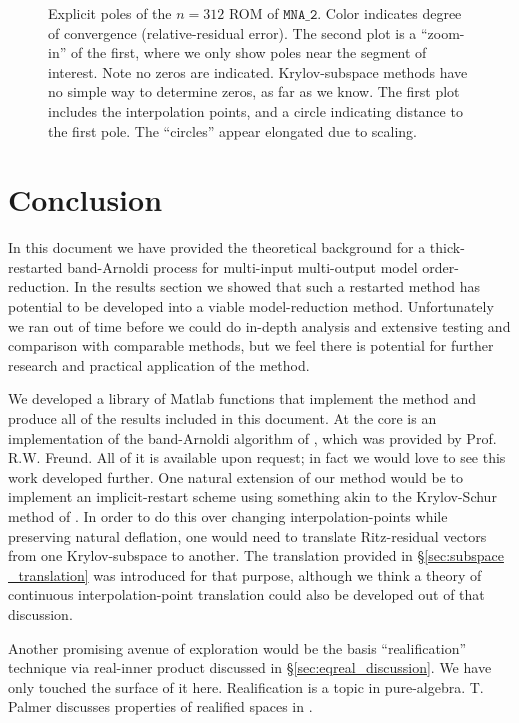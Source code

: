 \begin{figure}
\centering
{}

\caption{\label{fig:MNA2_poles} Explicit poles of the $n=312$ ROM of $\texttt{MNA\_2}$. Color indicates degree of convergence (relative-residual error).  The second plot is a ``zoom-in'' of the first, where we only show poles near the segment of interest.  Note no zeros are indicated.  Krylov-subspace methods have no simple way to determine zeros, as far as we know.  The first plot includes the interpolation points, and a circle indicating distance to the first pole.  The ``circles'' appear elongated due to scaling.}
\end{figure}






\chapter{Conclusion}
In this document we have provided the theoretical background for a thick-restarted band-Arnoldi process for multi-input multi-output model order-reduction.  In the results section we showed that such a restarted method has potential to be developed into a viable model-reduction method.   Unfortunately we ran out of time before we could do in-depth analysis and extensive testing and comparison with comparable methods,  but we feel there is potential for further research and practical application of the method.   

We developed a library of Matlab functions that implement the method and produce all of the results included in this document.    At the core is an  implementation of the band-Arnoldi algorithm of \cite{AN}, which was provided by Prof. R.W. Freund.    All of it is available upon request; in fact we would love to see this work developed further.    One natural extension of our method would be to implement an implicit-restart scheme using something akin to the Krylov-Schur method of \cite{stewart2002krylov}.    In order to do this over changing interpolation-points while preserving natural deflation, one would need to translate Ritz-residual vectors from one Krylov-subspace to another.  The translation provided in  \S\ref{sec:subspace _translation} was introduced for that purpose, although we think a theory of continuous interpolation-point translation could also be developed out of that discussion.   

Another promising avenue of exploration would be the basis ``realification'' technique via real-inner product  discussed in \S\ref{sec:eqreal_discussion}.   We have only touched the surface of it here.  Realification is a topic in pure-algebra. T. Palmer discusses properties of realified spaces in \cite{palmer2001banach}.
 
